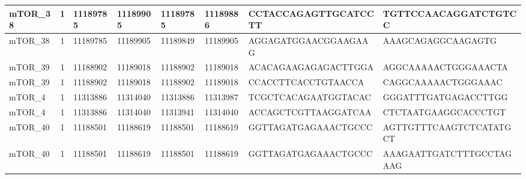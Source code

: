 \begin{landscape}
\begin{longtable}{| p{} | p{} | p{} | p{} | p{} | p{} | p{} | p{} |}
\multicolumn{1}{|l|}{mTOR\_38}   & \multicolumn{1}{c|}{1}  & \multicolumn{1}{l|}{11189785}  & \multicolumn{1}{l|}{11189905}  & \multicolumn{1}{l|}{11189785}  & \multicolumn{1}{l|}{11189886}  & \multicolumn{1}{l|}{CCTACCAGAGTTGCATCCTT}            & \multicolumn{1}{l|}{TGTTCCAACAGGATCTGTCC}          \\ \hline
\multicolumn{1}{|l|}{mTOR\_38}   & \multicolumn{1}{c|}{1}  & \multicolumn{1}{l|}{11189785}  & \multicolumn{1}{l|}{11189905}  & \multicolumn{1}{l|}{11189849}  & \multicolumn{1}{l|}{11189905}  & \multicolumn{1}{l|}{AGGAGATGGAACGGAAGAAG}            & \multicolumn{1}{l|}{AAAGCAGAGGCAAGAGTG}            \\ \hline
\multicolumn{1}{|l|}{mTOR\_39}   & \multicolumn{1}{c|}{1}  & \multicolumn{1}{l|}{11188902}  & \multicolumn{1}{l|}{11189018}  & \multicolumn{1}{l|}{11188902}  & \multicolumn{1}{l|}{11189018}  & \multicolumn{1}{l|}{ACACAGAAGAGAGACTTGGA}            & \multicolumn{1}{l|}{AGGCAAAAACTGGGAAACTA}          \\ \hline
\multicolumn{1}{|l|}{mTOR\_39}   & \multicolumn{1}{c|}{1}  & \multicolumn{1}{l|}{11188902}  & \multicolumn{1}{l|}{11189018}  & \multicolumn{1}{l|}{11188902}  & \multicolumn{1}{l|}{11189018}  & \multicolumn{1}{l|}{CCACCTTCACCTGTAACCA}             & \multicolumn{1}{l|}{CAGGCAAAAACTGGGAAAC}           \\ \hline
\multicolumn{1}{|l|}{mTOR\_4}    & \multicolumn{1}{c|}{1}  & \multicolumn{1}{l|}{11313886}  & \multicolumn{1}{l|}{11314040}  & \multicolumn{1}{l|}{11313886}  & \multicolumn{1}{l|}{11313987}  & \multicolumn{1}{l|}{TCGCTCACAGAATGGTACAC}            & \multicolumn{1}{l|}{GGGATTTGATGAGACCTTGG}          \\ \hline
\multicolumn{1}{|l|}{mTOR\_4}    & \multicolumn{1}{c|}{1}  & \multicolumn{1}{l|}{11313886}  & \multicolumn{1}{l|}{11314040}  & \multicolumn{1}{l|}{11313941}  & \multicolumn{1}{l|}{11314040}  & \multicolumn{1}{l|}{ACCAGCTCGTTAAGGATCAA}            & \multicolumn{1}{l|}{CTCTAATGAAGGCACCCTGT}          \\ \hline
\multicolumn{1}{|l|}{mTOR\_40}   & \multicolumn{1}{c|}{1}  & \multicolumn{1}{l|}{11188501}  & \multicolumn{1}{l|}{11188619}  & \multicolumn{1}{l|}{11188501}  & \multicolumn{1}{l|}{11188619}  & \multicolumn{1}{l|}{GGTTAGATGAGAAACTGCCC}            & \multicolumn{1}{l|}{AGTTGTTTCAAGTCTCATATGCT}       \\ \hline
\multicolumn{1}{|l|}{mTOR\_40}   & \multicolumn{1}{c|}{1}  & \multicolumn{1}{l|}{11188501}  & \multicolumn{1}{l|}{11188619}  & \multicolumn{1}{l|}{11188501}  & \multicolumn{1}{l|}{11188619}  & \multicolumn{1}{l|}{GGTTAGATGAGAAACTGCCC}            & \multicolumn{1}{l|}{AAAGAATTGATCTTTGCCTAGAAG}      \\ \hline

\end{longtable}
\end{landscape}
